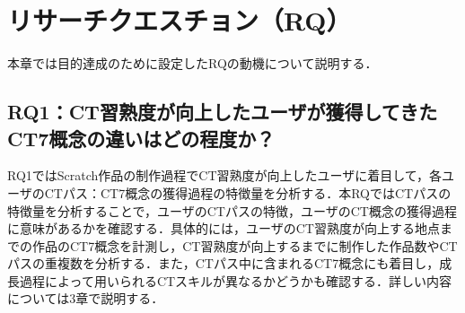 \documentclass[11pt,dvipdfmx]{jreport}
\newcommand{\todo}[1]{\colorbox{yellow}{{\bf TODO}:}{\color{red} {\textbf{[#1]}}}}
\begin{document}



\section{リサーチクエスチョン（RQ）}
本章では目的達成のために設定したRQの動機について説明する．
\subsection{RQ1：CT習熟度が向上したユーザが獲得してきたCT7概念の違いはどの程度か？}
RQ1ではScratch作品の制作過程でCT習熟度が向上したユーザに着目して，各ユーザのCTパス：CT7概念の獲得過程の特徴量を分析する．本RQではCTパスの特徴量を分析することで，ユーザのCTパスの特徴，ユーザのCT概念の獲得過程に意味があるかを確認する．具体的には，ユーザのCT習熟度が向上する地点までの作品のCT7概念を計測し，CT習熟度が向上するまでに制作した作品数やCTパスの重複数を分析する．また，CTパス中に含まれるCT7概念にも着目し，成長過程によって用いられるCTスキルが異なるかどうかも確認する．詳しい内容については3章で説明する．
\end{document}
